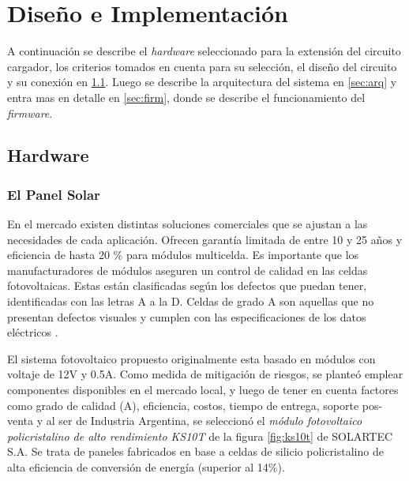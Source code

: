 
\chapter{Diseño e Implementación} %

\label{Chapter3} %

A continuación se describe el \textit{hardware} seleccionado para la extensión del circuito cargador, los criterios tomados en cuenta para su selección, el diseño del circuito y su conexión en \ref{sec:hard}. Luego se describe la arquitectura del sistema en \ref{sec:arq} y entra mas en detalle en \ref{sec:firm}, donde se describe el funcionamiento del \textit{firmware}. 

\section{Hardware}
\label{sec:hard}

\subsection{El Panel Solar}
\label{subsec:panel} 
En el mercado existen distintas soluciones comerciales que se ajustan a las necesidades de cada aplicación. Ofrecen garantía limitada de entre 10 y 25 años y eficiencia de hasta 20 \% para módulos multicelda.
Es importante que los manufacturadores de módulos aseguren un control de calidad en las celdas fotovoltaicas. Estas están clasificadas según los defectos que puedan tener, identificadas con las letras A a la D. Celdas de grado A son aquellas que no presentan defectos visuales y cumplen con las especificaciones de los datos eléctricos \citep{grado}.

El sistema fotovoltaico propuesto originalmente esta basado en módulos con voltaje de 12V y 0.5A. Como medida de mitigación de riesgos, se planteó emplear componentes disponibles en el mercado local, y luego de tener en cuenta factores como grado de calidad (A), eficiencia, costos, tiempo de entrega, soporte pos-venta y al ser de Industria Argentina, se seleccionó el \textit{módulo fotovoltaico policristalino de alto rendimiento KS10T} \citep{solar} de la figura \ref{fig:ks10t} de SOLARTEC S.A. Se trata de paneles fabricados en base a celdas de silicio policristalino de alta eficiencia de conversión de energía (superior al 14\%).

